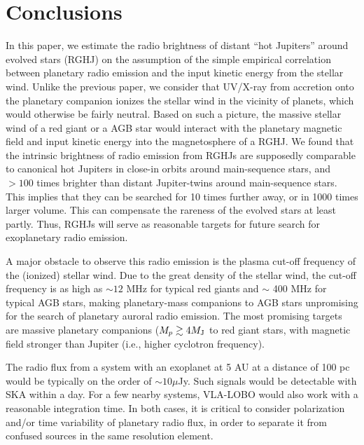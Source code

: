\documentclass[iop,numberedappendix,apj]{emulateapj}
\begin{document}
\section{Conclusions}
\label{s:conc}

In this paper, we estimate the radio brightness of distant ``hot Jupiters'' around evolved stars (RGHJ) on the assumption of the simple empirical correlation between planetary radio emission and the input kinetic energy from the stellar wind. 
Unlike the previous paper, we consider that UV/X-ray from accretion onto the planetary companion ionizes the stellar wind in the vicinity of planets, which would otherwise be fairly neutral. 
Based on such a picture, the massive stellar wind of a red giant or a AGB star would interact with the planetary magnetic field and input kinetic energy into the magnetosphere of a RGHJ. 
We found that the intrinsic brightness of radio emission from RGHJs are supposedly comparable to canonical hot Jupiters in close-in orbits around main-sequence stars, and $>100$ times brighter than distant Jupiter-twins around main-sequence stars. This implies that they can be searched for 10 times further away, or in 1000 times larger volume. This can compensate the rareness of the evolved stars at least partly. Thus, RGHJs will serve as  reasonable targets for future search for exoplanetary radio emission. 

A major obstacle to observe this radio emission is the plasma cut-off frequency of the (ionized) stellar wind. Due to the great density of the stellar wind, the cut-off frequency is as high as $\sim 12$ MHz for typical red giants and $\sim$ 400 MHz for typical AGB stars, making planetary-mass companions to AGB stars unpromising for the search of planetary auroral radio emission. 
The most promising targets are massive planetary companions ($M_p \gtrsim 4 M_{\rm J}$ to red giant stars, with magnetic field stronger than Jupiter (i.e., higher cyclotron frequency). 

The radio flux from a system with an exoplanet at 5 AU at a distance of 100 pc would be typically on the order of $\sim 10 \mu $Jy.
Such signals would be detectable with SKA within a day. 
For a few nearby systems, VLA-LOBO would also work with a reasonable integration time.
In both cases, it is critical to consider polarization and/or time variability of planetary radio flux, in order to separate it from confused sources in the same resolution element. 
\end{document}
